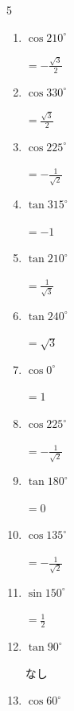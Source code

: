 \begin{multicols}{5}
\begin{enumerate}
        $\displaystyle =-\frac{1}{2}$

  \item $\displaystyle \cos{210^\circ}$

        $\displaystyle =-\frac{\sqrt{3}}{2}$

  \item $\displaystyle \cos{330^\circ}$

        $\displaystyle =\frac{\sqrt{3}}{2}$

  \item $\displaystyle \cos{225^\circ}$

        $\displaystyle =-\frac{1}{\sqrt{2}}$

  \item $\displaystyle \tan{315^\circ}$

        $\displaystyle =-1$

  \item $\displaystyle \tan{210^\circ}$

        $\displaystyle =\frac{1}{\sqrt{3}}$

  \item $\displaystyle \tan{240^\circ}$

        $\displaystyle =\sqrt{3}$

  \item $\displaystyle \cos{0^\circ}$

        $\displaystyle =1$

  \item $\displaystyle \cos{225^\circ}$

        $\displaystyle =-\frac{1}{\sqrt{2}}$

  \item $\displaystyle \tan{180^\circ}$

        $\displaystyle =0$

  \item $\displaystyle \cos{135^\circ}$

        $\displaystyle =-\frac{1}{\sqrt{2}}$

\columnbreak %

  \item $\displaystyle \sin{150^\circ}$

        $\displaystyle =\frac{1}{2}$

  \item $\displaystyle \tan{90^\circ}$

        $\displaystyle なし$

  \item $\displaystyle \cos{60^\circ}$


\end{enumerate}
\end{multicols}
